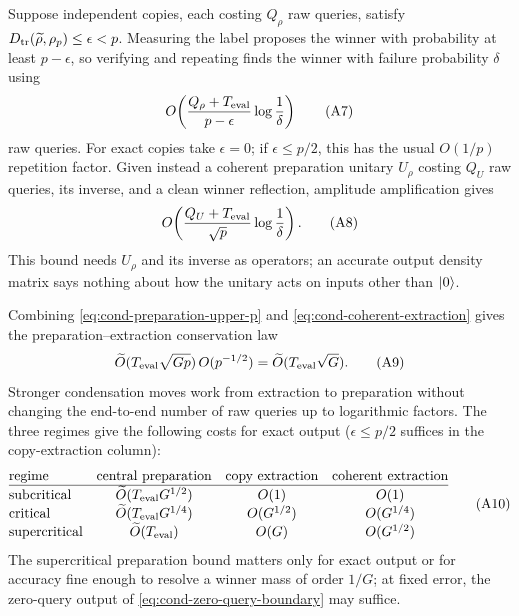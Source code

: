 Suppose independent copies, each costing $Q_\rho$ raw queries, satisfy
$D_{\mathrm{tr}}(\widetilde\rho,\rho_p)\le\epsilon<p$.  Measuring the label proposes
the winner with probability at least $p-\epsilon$, so verifying and
repeating finds the winner with failure probability $\delta$ using
\begin{equation*}
 O\!\left(\frac{Q_\rho+T_{\rm eval}}{p-\epsilon}
          \log\frac1\delta\right)                                     \condtag{A7}\label{eq:cond-copy-extraction}
\end{equation*}
raw queries.  For exact copies take $\epsilon=0$; if
$\epsilon\le p/2$, this has the usual $O(1/p)$ repetition factor.  Given
instead a coherent preparation unitary $U_\rho$ costing $Q_U$ raw queries,
its inverse, and a clean winner reflection, amplitude amplification gives
\begin{equation*}
 O\!\left(\frac{Q_U+T_{\rm eval}}{\sqrt p}\log\frac1\delta\right).     \condtag{A8}\label{eq:cond-coherent-extraction}
\end{equation*}
This bound needs $U_\rho$ and its inverse as operators; an accurate output
density matrix says nothing about how the unitary acts on inputs other than
$\lvert 0\rangle$.

Combining \eqref{eq:cond-preparation-upper-p} and
\eqref{eq:cond-coherent-extraction} gives the preparation--extraction
conservation law
\begin{equation*}
 \Otilde(T_{\rm eval}\sqrt{Gp})\,O(p^{-1/2})
   =\Otilde(T_{\rm eval}\sqrt G).                                     \condtag{A9}\label{eq:cond-conservation}
\end{equation*}
Stronger condensation moves work from extraction to preparation without
changing the end-to-end number of raw queries up to logarithmic factors.
The three regimes give the following costs for exact output
($\epsilon\le p/2$ suffices in the copy-extraction column):
\begin{equation*}
\begin{array}{@{}lccc@{}}
 \text{regime} & \text{central preparation} & \text{copy extraction}
   & \text{coherent extraction}\\ \hline
 \text{subcritical} & \Otilde(T_{\rm eval}G^{1/2}) & O(1) & O(1)\\
 \text{critical} & \Otilde(T_{\rm eval}G^{1/4}) & O(G^{1/2}) & O(G^{1/4})\\
 \text{supercritical} & \Otilde(T_{\rm eval}) & O(G) & O(G^{1/2})
\end{array}                                                            \condtag{A10}\label{eq:cond-algorithm-phases}
\end{equation*}
The supercritical preparation bound matters only for exact output or for
accuracy fine enough to resolve a winner mass of order $1/G$; at fixed
error, the zero-query output of \eqref{eq:cond-zero-query-boundary} may
suffice.

